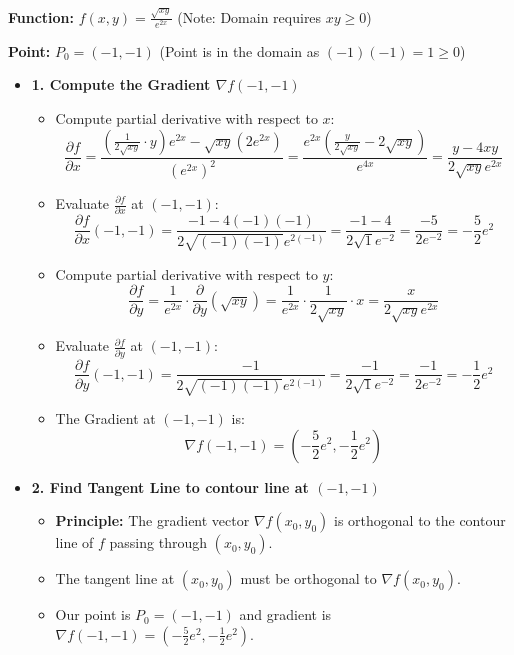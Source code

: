 \hfill

\begin{cascade}
	\textbf{Function:} $f(x,y) = \frac{\sqrt{xy}}{e^{2x}}$ \quad (Note: Domain requires $xy \ge 0$)

	\textbf{Point:} $P_0 = (-1, -1)$ (Point is in the domain as $(-1)(-1) = 1 \ge 0$)
	\begin{itemize}
		\item \textbf{1. Compute the Gradient $\nabla f(-1,-1)$}
		      \begin{itemize}
			      \item Compute partial derivative with respect to $x$:
			            $$ \frac{\partial f}{\partial x} = \frac{(\frac{1}{2\sqrt{xy}} \cdot y) e^{2x} - \sqrt{xy} (2e^{2x})}{(e^{2x})^2} = \frac{e^{2x}(\frac{y}{2\sqrt{xy}} - 2\sqrt{xy})}{e^{4x}} = \frac{y - 4xy}{2\sqrt{xy} e^{2x}} $$
			      \item Evaluate $\frac{\partial f}{\partial x}$ at $(-1,-1)$:
			            $$ \frac{\partial f}{\partial x}(-1,-1) = \frac{-1 - 4(-1)(-1)}{2\sqrt{(-1)(-1)} e^{2(-1)}} = \frac{-1 - 4}{2\sqrt{1} e^{-2}} = \frac{-5}{2e^{-2}} = -\frac{5}{2}e^2 $$
			      \item Compute partial derivative with respect to $y$:
			            $$ \frac{\partial f}{\partial y} = \frac{1}{e^{2x}} \cdot \frac{\partial}{\partial y}(\sqrt{xy}) = \frac{1}{e^{2x}} \cdot \frac{1}{2\sqrt{xy}} \cdot x = \frac{x}{2\sqrt{xy} e^{2x}} $$
			      \item Evaluate $\frac{\partial f}{\partial y}$ at $(-1,-1)$:
			            $$ \frac{\partial f}{\partial y}(-1,-1) = \frac{-1}{2\sqrt{(-1)(-1)} e^{2(-1)}} = \frac{-1}{2\sqrt{1} e^{-2}} = \frac{-1}{2e^{-2}} = -\frac{1}{2}e^2 $$
			      \item The Gradient at $(-1,-1)$ is:
			            $$ \nabla f(-1,-1) = \left( -\frac{5}{2}e^2, -\frac{1}{2}e^2 \right) $$
		      \end{itemize}
		\item \textbf{2. Find Tangent Line to contour line at $(-1,-1)$}
		      \begin{itemize}
			      \item \textbf{Principle:} The gradient vector $\nabla f(x_0, y_0)$ is orthogonal to the contour line of $f$ passing through $(x_0, y_0)$.
			      \item The tangent line at $(x_0, y_0)$ must be orthogonal to $\nabla f(x_0, y_0)$.
			      \item Our point is $P_0 = (-1, -1)$ and gradient is $\nabla f(-1,-1) = (-\frac{5}{2}e^2, -\frac{1}{2}e^2)$.

\end{itemize}
\end{itemize}
\end{cascade}
